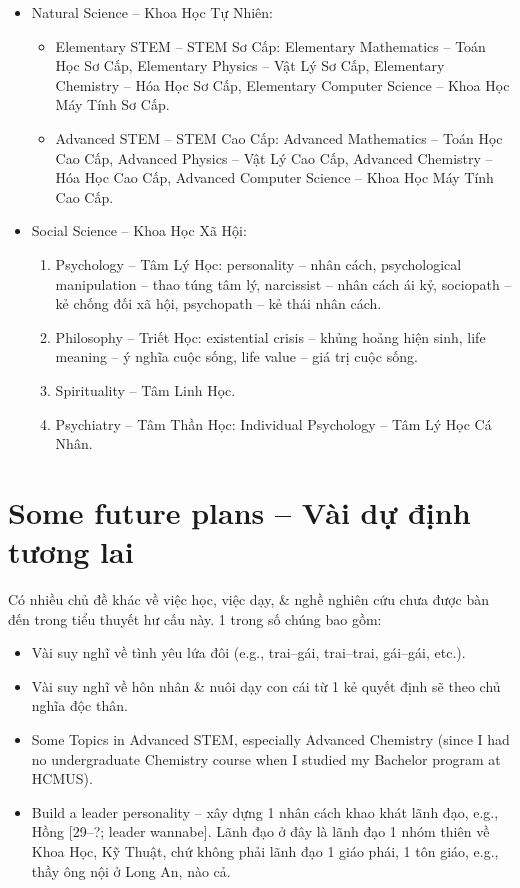 \documentclass[12pt,twoside]{book}
\begin{document}
\begin{itemize}
	\item Natural Science -- Khoa Học Tự Nhiên:
	\begin{itemize}
		\item Elementary STEM -- STEM Sơ Cấp: Elementary Mathematics -- Toán Học Sơ Cấp, Elementary Physics -- Vật Lý Sơ Cấp, Elementary Chemistry -- Hóa Học Sơ Cấp, Elementary Computer Science -- Khoa Học Máy Tính Sơ Cấp.
		\item Advanced STEM -- STEM Cao Cấp: Advanced Mathematics -- Toán Học Cao Cấp, Advanced Physics -- Vật Lý Cao Cấp, Advanced Chemistry -- Hóa Học Cao Cấp, Advanced Computer Science -- Khoa Học Máy Tính Cao Cấp.
	\end{itemize}
	\item Social Science -- Khoa Học Xã Hội:
	\begin{enumerate}
		\item Psychology -- Tâm Lý Học: personality -- nhân cách, psychological manipulation -- thao túng tâm lý, narcissist -- nhân cách ái kỷ, sociopath -- kẻ chống đối xã hội, psychopath -- kẻ thái nhân cách.
		\item Philosophy -- Triết Học: existential crisis -- khủng hoảng hiện sinh, life meaning -- ý nghĩa cuộc sống, life value -- giá trị cuộc sống.
		\item Spirituality -- Tâm Linh Học.
		\item Psychiatry -- Tâm Thần Học: Individual Psychology -- Tâm Lý Học Cá Nhân.
	\end{enumerate}
\end{itemize}

\section{Some future plans -- Vài dự định tương lai}
Có nhiều chủ đề khác về việc học, việc dạy, \& nghề nghiên cứu chưa được bàn đến trong tiểu thuyết hư cấu này. 1 trong số chúng bao gồm:
\begin{itemize}
	\item Vài suy nghĩ về tình yêu lứa đôi (e.g., trai--gái, trai--trai, gái--gái, etc.).
	\item Vài suy nghĩ về hôn nhân \& nuôi dạy con cái từ 1 kẻ quyết định sẽ theo chủ nghĩa độc thân.
	\item Some Topics in Advanced STEM, especially Advanced Chemistry (since I had no undergraduate Chemistry course when I studied my Bachelor program at HCMUS).
	\item Build a leader personality -- xây dựng 1 nhân cách khao khát lãnh đạo, e.g., {\sf Hồng [29--?; leader wannabe]}. Lãnh đạo ở đây là lãnh đạo 1 nhóm thiên về Khoa Học, Kỹ Thuật, chứ không phải lãnh đạo 1 giáo phái, 1 tôn giáo, e.g., thầy ông nội ở Long An, nào cả.
\end{itemize}
\end{document}
